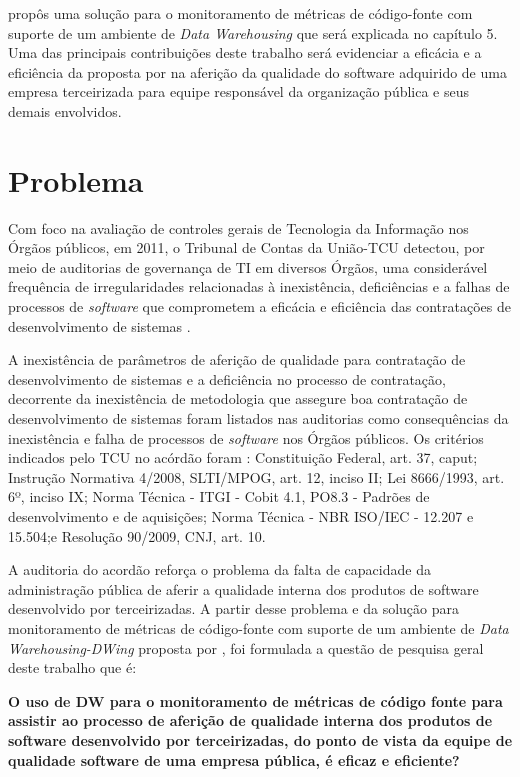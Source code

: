  propôs uma solução para o monitoramento de métricas de código-fonte com suporte de um ambiente de \textit{Data Warehousing} que será explicada no capítulo 5. Uma das principais contribuições deste trabalho será evidenciar a eficácia e a eficiência da proposta por  na aferição da qualidade do software adquirido de uma empresa terceirizada para equipe responsável da organização pública e seus demais envolvidos.

\section{Problema}
\label{problema} 

Com foco na avaliação de controles gerais de Tecnologia da Informação nos Órgãos públicos, em 2011, o Tribunal de Contas da União-TCU detectou, por meio de auditorias de governança de TI em diversos Órgãos, uma considerável frequência de irregularidades relacionadas à inexistência, deficiências e a falhas de processos de \textit{software} que comprometem a eficácia e eficiência das contratações de desenvolvimento de sistemas \cite{Acordao381_2011}. 

A inexistência de parâmetros de aferição de qualidade para contratação de desenvolvimento de sistemas e a deficiência no processo de contratação, decorrente da inexistência de metodologia que assegure boa contratação de desenvolvimento de sistemas foram listados nas auditorias como consequências da inexistência e falha de processos de \textit{software} nos Órgãos públicos. Os critérios indicados pelo TCU no acórdão \cite{Acordao381_2011} foram : Constituição Federal, art. 37, caput; Instrução Normativa 4/2008, SLTI/MPOG, art. 12, inciso II; Lei 8666/1993, art. 6º, inciso IX; Norma Técnica - ITGI - Cobit 4.1, PO8.3 - Padrões de desenvolvimento e de aquisições; Norma Técnica - NBR ISO/IEC - 12.207 e 15.504;e Resolução 90/2009, CNJ, art. 10. 

A auditoria do acordão \cite{Acordao381_2011} reforça o problema da falta de capacidade da administração pública de aferir a qualidade interna dos produtos de software desenvolvido por terceirizadas. A partir desse problema e da solução para monitoramento de métricas de código-fonte com suporte de um ambiente de \textit{Data Warehousing-DWing} proposta por , foi formulada a questão de pesquisa geral deste trabalho que é:

\textbf{O uso de DW para o monitoramento de métricas de código fonte para assistir ao processo de aferição de qualidade interna dos produtos de software desenvolvido por terceirizadas, do ponto de vista da equipe de qualidade software de uma empresa pública, é eficaz e eficiente?}



